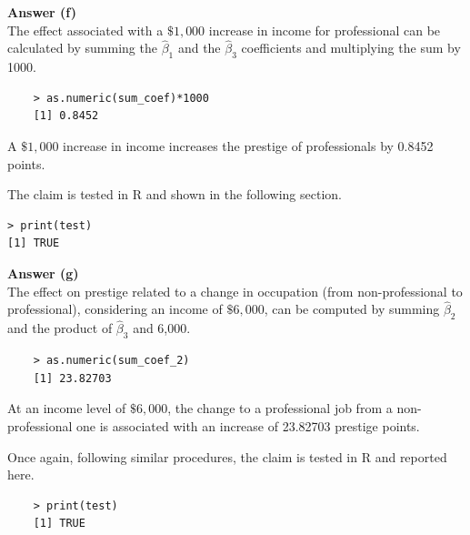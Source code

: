 \documentclass[12pt,letterpaper]{article}
\begin{document}
\vspace{0.5cm}
\noindent\textbf{Answer (f)}\\

\vspace{0.5cm}
\noindent The effect associated with a $\$1,000$ increase in income for professional can be calculated by summing the $\hat{\beta}_1$ and the $\hat{\beta}_3$ coefficients and multiplying the sum by 1000. 
 
\begin{verbatim}
	> as.numeric(sum_coef)*1000
	[1] 0.8452
\end{verbatim}
\noindent A $\$1,000$ increase in income increases the prestige of professionals by 0.8452 points. 
 
\vspace{0.5cm}
\noindent The claim is tested in R and shown in the following section.
 
\begin{verbatim}
> print(test)
[1] TRUE
\end{verbatim}

\vspace{0.5cm}
\noindent\textbf{Answer (g)}\\

\vspace{0.5cm}
\noindent The effect on prestige related to a change in occupation (from non-professional to professional), considering an income of $\$6,000$, can be computed by summing $\hat{\beta}_2$ and the product of $\hat{\beta}_3$ and 6,000.  
 
\begin{verbatim}
	> as.numeric(sum_coef_2)
	[1] 23.82703
\end{verbatim}
\noindent At an income level of $\$6,000$, the change to a professional job from a non-professional one is associated with an increase of 23.82703 prestige points. 

\vspace{0.5cm}
\noindent Once again, following similar procedures, the claim is tested in R and reported here.
 
\begin{verbatim}
	> print(test)
	[1] TRUE
\end{verbatim}


\newpage
\end{document}
